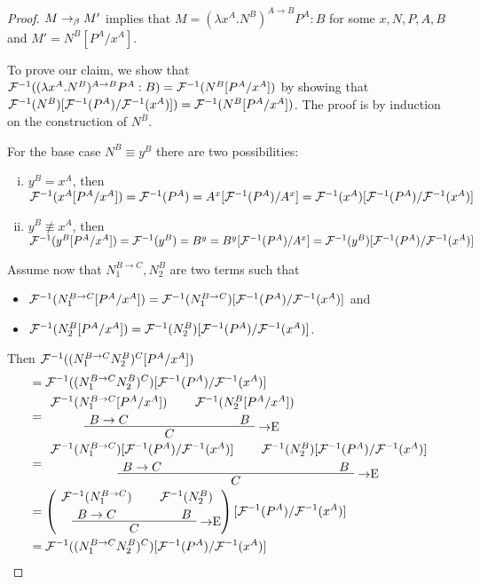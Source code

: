 \begin{proof}
$M \rightarrow_\beta M'$ implies that $M = (\lambda x^A.N^B)^{A \to B}P^A:B$ for some $x,
N, P, A, B$ and $M' = N^B[P^A/x^A]$.

To prove our claim, we show that $\mathcal{F}^{-1}((\lambda x^A.N^B)^{A \to B}P^A:B) =
\mathcal{F}^{-1}(N^B[P^A/x^A])$ by showing that
$\mathcal{F}^{-1}(N^B)[\mathcal{F}^{-1}(P^A)/\mathcal{F}^{-1}(x^A)]) = \mathcal{F}^{-1}(N^B[P^A/x^A])$.
The proof is by induction on the construction of $N^B$.

For the base case $N^B \equiv y^B$ there are two possibilities:
\begin{enumerate}[(i)]
  \item $y^B = x^A$, then \\
        $\mathcal{F}^{-1}(x^A[P^A/x^A]) = \mathcal{F}^{-1}(P^A) =
        A^x[\mathcal{F}^{-1}(P^A)/A^x] =
        \mathcal{F}^{-1}(x^A)[\mathcal{F}^{-1}(P^A)/\mathcal{F}^{-1}(x^A)]$
  \item $y^B \not\equiv x^A$, then \\
        $\mathcal{F}^{-1}(y^B[P^A/x^A]) = \mathcal{F}^{-1}(y^B) = B^y =
        B^y[\mathcal{F}^{-1}(P^A)/A^x] =
        \mathcal{F}^{-1}(y^B)[\mathcal{F}^{-1}(P^A)/\mathcal{F}^{-1}(x^A)]$
\end{enumerate}

Assume now that $N_1^{B \to C}, N_2^B$ are two terms such that
\begin{itemize}
\item $\mathcal{F}^{-1}(N_1^{B \to C}[P^A/x^A])
      = \mathcal{F}^{-1}(N_1^{B \to C})[\mathcal{F}^{-1}(P^A)/\mathcal{F}^{-1}(x^A)]$ and
\item $\mathcal{F}^{-1}(N_2^B[P^A/x^A]) = \mathcal{F}^{-1}(N_2^B)[\mathcal{F}^{-1}(P^A)/\mathcal{F}^{-1}(x^A)]$.
\end{itemize}
Then $\mathcal{F}^{-1}((N_1^{B \to C}N_2^B)^C[P^A/x^A])$
\begin{align*}
  &=
    \subchmapanta{(N_1^{B \to C}N_2^B)^C}{P^A}{x^A} \\
  &=
  \implelim{%
    \AxiomC{$\chmapantasub{N_1^{B \to C}}{P^A}{x^A}$}\noLine\UnaryInfC{$B \to C$}
  }{%
    \AxiomC{$\chmapantasub{N_2^B}{P^A}{x^A}$}\noLine\UnaryInfC{$B$}
  }{$C$}
  \DisplayProof \\
  &=
  \implelim{%
    \AxiomC{$\subchmapanta{N_1^{B \to C}}{P^A}{x^A}$}\noLine\UnaryInfC{$B \to C$}
  }{%
    \AxiomC{$\subchmapanta{N_2^B}{P^A}{x^A}$}\noLine\UnaryInfC{$B$}
  }{$C$}
  \DisplayProof \\
  &=
  \left(
  \implelim{%
    \AxiomC{$\chmapanta(N_1^{B \to C})$}\noLine\UnaryInfC{$B \to C$}
  }{%
    \AxiomC{$\chmapanta(N_2^B)$}\noLine\UnaryInfC{$B$}
  }{$C$}
  \DisplayProof
  \right)[\chmapanta(P^A)/\chmapanta(x^A)] \\
  &=
  \subchmapanta{(N_1^{B \to C}N_2^B)^C}{P^A}{x^A}
\end{align*}

\end{proof}
